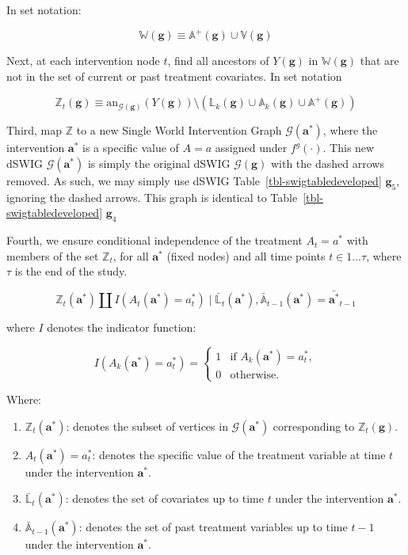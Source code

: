 \documentclass[
  single column]{article}
\providecommand{\tightlist}{%
  \setlength{\itemsep}{0pt}\setlength{\parskip}{0pt}}\usepackage{longtable,booktabs,array}
\begin{document}
In set notation:

\[
\mathbb{W}(\mathbf{g}) \equiv \mathbb{A}^+(\mathbf{g}) \cup \mathbb{V}(\mathbf{g})
\]

Next, at each intervention node \(t\), find all ancestors of
\(Y(\mathbf{g})\) in \(\mathbb{W}(\mathbf{g})\) that are not in the set
of current or past treatment covariates. In set notation

\[
\mathbb{Z}_t(\mathbf{g}) \equiv \text{an}_{\mathcal{G}(\mathbf{g})}(Y(\mathbf{g})) \setminus (\mathbb{L}_k(\mathbf{g}) \cup \mathbb{A}_k(\mathbf{g}) \cup \mathbb{A}^+(\mathbf{g}))
\]

Third, map \(\mathbb{Z}\) to a new Single World Intervention Graph
\(\mathcal{G}(\mathbf{a}^*)\), where the intervention \(\mathbf{a}^*\)
is a specific value of \(A = a\) assigned under \(f^g(\cdot)\). This new
dSWIG \(\mathcal{G}(\mathbf{a}^*)\) is simply the original dSWIG
\(\mathcal{G}(\mathbf{g})\) with the dashed arrows removed. As such, we
may simply use dSWIG Table~\ref{tbl-swigtabledeveloped}
\(\mathbf{g}_5\), ignoring the dashed arrows. This graph is identical to
Table~\ref{tbl-swigtabledeveloped} \(\mathbf{g}_4\)

Fourth, we ensure conditional independence of the treatment
\(A_t = a^*\) with members of the set \(\mathbb{Z}_t\), for all
\(\mathbf{a}^*\) (fixed nodes) and all time points \(t \in 1...\tau\),
where \(\tau\) is the end of the study.

\[
\mathbb{Z}_t(\mathbf{a}^*) \coprod I(A_t(\mathbf{a}^*) = a^*_t) \mid \bar{\mathbb{L}}_t(\mathbf{a}^*), \bar{\mathbb{A}}_{t-1}(\mathbf{a}^*) = \bar{\mathbf{a}^*}_{t-1}
\]

where \(I\) denotes the indicator function:

\[
I(A_k(\mathbf{a}^*) = a^*_t) = 
\begin{cases} 
1 & \text{if } A_k(\mathbf{a}^*) = a^*_t, \\
0 & \text{otherwise}.
\end{cases}
\]

Where:

\begin{enumerate}
\def\labelenumi{\arabic{enumi}.}
\tightlist
\item
  \textbf{\(\mathbb{Z}_t(\mathbf{a}^*)\)}: denotes the subset of
  vertices in \(\mathcal{G}(\mathbf{a}^*)\) corresponding to
  \(\mathbb{Z}_t(\mathbf{g})\).
\item
  \textbf{\(A_t(\mathbf{a}^*) = a^*_t\)}: denotes the specific value of
  the treatment variable at time \(t\) under the intervention
  \(\mathbf{a}^*\).
\item
  \textbf{\(\bar{\mathbb{L}}_t(\mathbf{a}^*)\)}: denotes the set of
  covariates up to time \(t\) under the intervention \(\mathbf{a}^*\).
\item
  \textbf{\(\bar{\mathbb{A}}_{t-1}(\mathbf{a}^*)\)}: denotes the set of
  past treatment variables up to time \(t-1\) under the intervention
  \(\mathbf{a}^*\).
\end{enumerate}
\end{document}
